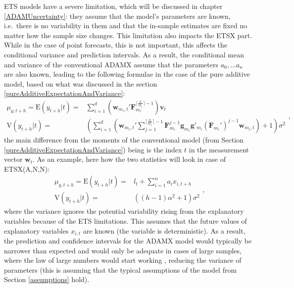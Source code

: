 \documentclass[]{book}
\theoremstyle{definition}
\theoremstyle{definition}
\theoremstyle{definition}
\theoremstyle{definition}
\theoremstyle{remark}
\begin{document}
ETS models have a severe limitation, which will be discussed in chapter \ref{ADAMUncertainty}: they assume that the model's parameters are known, i.e.~there is no variability in them and that the in-sample estimates are fixed no matter how the sample size changes. This limitation also impacts the ETSX part. While in the case of point forecasts, this is not important, this affects the conditional variance and prediction intervals. As a result, the conditional mean and variance of the conventional ADAMX assume that the parameters \(a_0, \dots a_n\) are also known, leading to the following formulae in the case of the pure additive model, based on what was discussed in the section \ref{pureAdditiveExpectationAndVariance}:
\begin{equation}
  \begin{aligned}
    \mu_{y,t+h} = \text{E}(y_{t+h}|t) = & \sum_{i=1}^d \left(\mathbf{w}_{m_i,t}' \mathbf{F}_{m_i}^{\lceil\frac{h}{m_i}\rceil-1} \right) \mathbf{v}_{t} \\
    \text{V}(y_{t+h}|t) = & \left( \sum_{i=1}^d \left(\mathbf{w}_{m_i,t}' \sum_{j=1}^{\lceil\frac{h}{m_i}\rceil-1} \mathbf{F}_{m_i}^{j-1} \mathbf{g}_{m_i} \mathbf{g}'_{m_i} (\mathbf{F}_{m_i}')^{j-1} \mathbf{w}_{m_i,t} \right) + 1 \right) \sigma^2
  \end{aligned},
  \label{eq:ETSXADAMStateSpaceANNRecursionMeanAndVarianceGeneral}
\end{equation}
the main difference from the moments of the conventional model (from Section \ref{pureAdditiveExpectationAndVariance}) being is the index \(t\) in the measurement vector \(\mathbf{w}_t\). As an example, here how the two statistics will look in case of ETSX(A,N,N):
\begin{equation}
  \begin{aligned}
    \mu_{y,t+h} = \text{E}(y_{t+h}|t) = & l_{t} + \sum_{i=1}^n a_i x_{i,t+h} \\
    \text{V}(y_{t+h}|t) = & \left((h-1) \alpha^2 + 1 \right) \sigma^2
  \end{aligned},
  \label{eq:ETSXADAMStateSpaceANNRecursionMeanAndVariance}
\end{equation}
where the variance ignores the potential variability rising from the explanatory variables because of the ETS limitations. This assumes that the future values of explanatory variables \(x_{i,t}\) are known (the variable is deterministic). As a result, the prediction and confidence intervals for the ADAMX model would typically be narrower than expected and would only be adequate in cases of large samples, where the law of large numbers would start working \citep[Section 4.2 of][]{SvetunkovSBA}, reducing the variance of parameters (this is assuming that the typical assumptions of the model from Section \ref{assumptions} hold).
\end{document}
